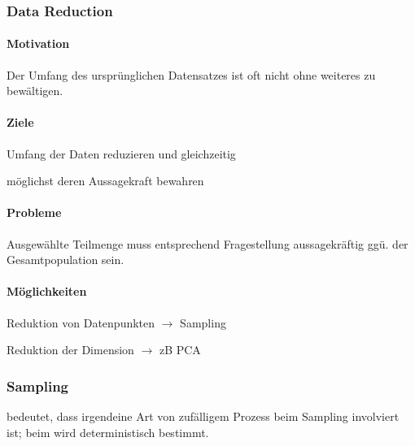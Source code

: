 \documentclass[10pt]{article} %
\begin{document}
\subsubsection{Data Reduction}

\paragraph{Motivation} Der Umfang des ursprünglichen Datensatzes ist oft nicht ohne weiteres zu bewältigen.

\paragraph{Ziele}
\begin{cptitemize} 
       \item Umfang der Daten reduzieren und gleichzeitig 
       \item möglichst deren Aussagekraft bewahren
 \end{cptitemize}  

\paragraph{Probleme} Ausgewählte Teilmenge muss entsprechend Fragestellung aussagekräftig ggü. der Gesamtpopulation sein.

\paragraph{Möglichkeiten}
\begin{cptitemize} 
       \item Reduktion von Datenpunkten $\rightarrow$ Sampling
       \item Reduktion der Dimension $\rightarrow$ zB PCA
 \end{cptitemize}  

\subsubsection{Sampling} 
\label{sec:sampling}


\begin{definition} 
          bedeutet, dass irgendeine Art von zufälligem Prozess beim Sampling involviert ist; beim  wird deterministisch bestimmt.
\end{definition} 
\end{document}
